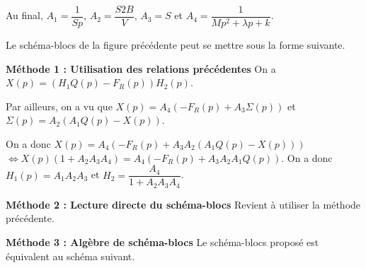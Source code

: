Au final,  $A_1=\dfrac{1}{Sp}$,  $A_2 = \dfrac{S2B}{V} $,  $A_3 = S$  et $A_4 = \dfrac{1}{Mp^2  +\lambda p  + k}$.

\else
\fi

\ifprof
\else

Le schéma-blocs de la figure précédente peut se mettre sous la forme suivante. 

\footnotesize
\begin{marginfigure}
\end{marginfigure}
\normalsize

\fi

\ifprof

\textbf{Méthode 1 : Utilisation des relations précédentes}
On a $X(p)=\left(H_1Q(p)-F_R(p)\right)H_2(p)$. 

Par ailleurs, on a vu que $X(p)=A_4\left(-F_R(p)+A_3\Sigma(p)\right) $ et $\Sigma(p)=A_2\left(A_1Q(p)-X(p)\right)$. 

On a donc $X(p)=A_4\left(-F_R(p)+A_3  A_2\left(A_1Q(p)-X(p)\right)\right) $ $ \Leftrightarrow X(p)\left(1+A_2A_3A_4 \right)=A_4\left(-F_R(p)+A_3  A_2A_1Q(p)\right) $. On a donc 
$H_1(p)=A_1  A_2A_3$ et $H_2 = \dfrac{A_4}{1+ A_2A_3A_4 }$.

\textbf{Méthode 2 : Lecture directe du schéma-blocs}
Revient à utiliser la méthode précédente. 

\textbf{Méthode 3 : Algèbre de schéma-blocs}
Le schéma-blocs proposé est équivalent au schéma suivant. 


